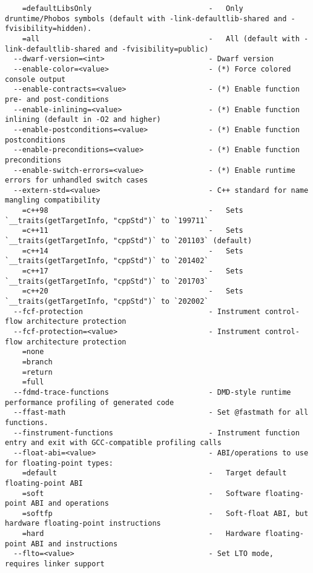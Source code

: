 \documentclass{studrep}
\begin{document}
\begin{verbatim}
    =defaultLibsOnly                           -   Only druntime/Phobos symbols (default with -link-defaultlib-shared and -fvisibility=hidden).
    =all                                       -   All (default with -link-defaultlib-shared and -fvisibility=public)
  --dwarf-version=<int>                        - Dwarf version
  --enable-color=<value>                       - (*) Force colored console output
  --enable-contracts=<value>                   - (*) Enable function pre- and post-conditions
  --enable-inlining=<value>                    - (*) Enable function inlining (default in -O2 and higher)
  --enable-postconditions=<value>              - (*) Enable function postconditions
  --enable-preconditions=<value>               - (*) Enable function preconditions
  --enable-switch-errors=<value>               - (*) Enable runtime errors for unhandled switch cases
  --extern-std=<value>                         - C++ standard for name mangling compatibility
    =c++98                                     -   Sets `__traits(getTargetInfo, "cppStd")` to `199711`
    =c++11                                     -   Sets `__traits(getTargetInfo, "cppStd")` to `201103` (default)
    =c++14                                     -   Sets `__traits(getTargetInfo, "cppStd")` to `201402`
    =c++17                                     -   Sets `__traits(getTargetInfo, "cppStd")` to `201703`
    =c++20                                     -   Sets `__traits(getTargetInfo, "cppStd")` to `202002`
  --fcf-protection                             - Instrument control-flow architecture protection
  --fcf-protection=<value>                     - Instrument control-flow architecture protection
    =none
    =branch
    =return
    =full
  --fdmd-trace-functions                       - DMD-style runtime performance profiling of generated code
  --ffast-math                                 - Set @fastmath for all functions.
  --finstrument-functions                      - Instrument function entry and exit with GCC-compatible profiling calls
  --float-abi=<value>                          - ABI/operations to use for floating-point types:
    =default                                   -   Target default floating-point ABI
    =soft                                      -   Software floating-point ABI and operations
    =softfp                                    -   Soft-float ABI, but hardware floating-point instructions
    =hard                                      -   Hardware floating-point ABI and instructions
  --flto=<value>                               - Set LTO mode, requires linker support

\end{verbatim}
\end{document}
